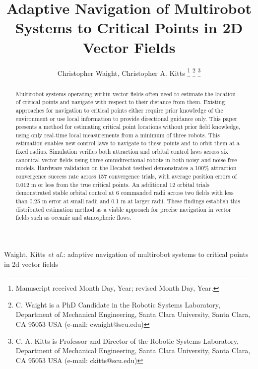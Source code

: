 \documentclass[lettersize,journal]{IEEEtran}
\begin{document}
\title{Adaptive Navigation of Multirobot Systems to Critical Points in 2D Vector Fields}
\author{Christopher Waight, Christopher A. Kitts 
\thanks{Manuscript received Month Day, Year; revised Month Day, Year.}
\thanks{C. Waight is a PhD Candidate in the Robotic Systems Laboratory, Department of Mechanical Engineering, Santa Clara University, Santa Clara, CA 95053 USA (e-mail: cwaight@scu.edu)}
\thanks{C. A. Kitts is Professor and Director of the Robotic Systems Laboratory, Department of Mechanical Engineering, Santa Clara University, Santa Clara, CA 95053 USA (e-mail: ckitts@scu.edu)}
}
%
{Waight, Kitts \MakeLowercase{\textit{et al.}: Adaptive Navigation of Multirobot Systems to Critical Points in 2D Vector Fields}}


\maketitle

\begin{abstract}
    Multirobot systems operating within vector fields often need to estimate the location of critical points and navigate with respect to their distance from them. Existing approaches for navigation to critical points either require prior knowledge of the environment or use local information to provide directional guidance only. This paper presents a method for estimating critical point locations without prior field knowledge, using only real-time local measurements from a minimum of three robots.
    This estimation enables new control laws to navigate to these points and to orbit them at a fixed radius.
    Simulation verifies both attraction and orbital control laws across six canonical vector fields using three omnidirectional robots in both noisy and noise free models. Hardware validation on the Decabot testbed demonstrates a 100\% attraction convergence success rate across 157 convergence trials, with average position errors of 0.012 m or less from the true critical points. An additional 12 orbital trials demonstrated stable orbital control at 6 commanded radii across two fields with less than 0.25 m error at small radii and 0.1 m at larger radii. These findings establish this distributed estimation method as a viable approach for precise navigation in vector fields such as oceanic and atmospheric flows.  

\end{abstract}
\end{document}
